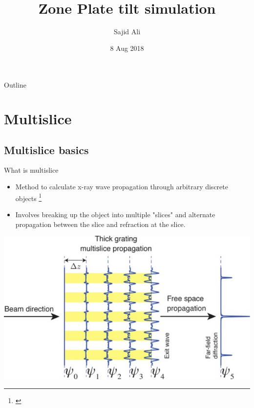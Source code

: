 \documentclass{beamer}
\title{Zone Plate tilt simulation }
\author{Sajid Ali\inst{1}}
\institute[NU] %
{
  \inst{1}%
  Applied Physics\\
  Northwestern Univ}
\date{8 Aug 2018}
\begin{document}
\begin{frame}
  \titlepage
\end{frame}

\begin{frame}{Outline}
  \tableofcontents
\end{frame}

\section{Multislice}

\subsection{Multislice basics}

\begin{frame}{What is multislice}
  \begin{itemize}
  \item Method to calculate x-ray wave propagation through arbitrary discrete objects
  \footnote{\cite{Li2015}\cite{Li2017}}
  \item Involves breaking up the object into multiple "slices" and alternate propagation between the slice and refraction at the slice.
  \end{itemize}
	  \begin{center}
  \includegraphics[scale=0.5]{multislice}
      	\end{center}
\end{frame}
\end{document}
